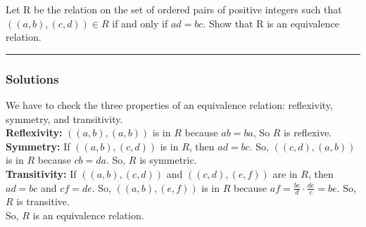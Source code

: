 \newpage
\begin{question}
Let R be the relation on the set of ordered pairs of positive integers such that $((a, b), (c, d)) \in R$ if and only if
$ad = bc$. Show that R is an equivalence relation.
\end{question}

\par\noindent\rule{\textwidth}{0.5pt}

\subsubsection*{Solutions}
We have to check the three properties of an equivalence relation: reflexivity, symmetry, and transitivity.\\
\textbf{Reflexivity: } $((a, b), (a, b))$ is in $R$ because $ab = ba$, So $R$ is reflexive.\\
\textbf{Symmetry: } If $((a, b), (c, d))$ is in $R$, then $ad = bc$. So, $((c, d), (a, b))$ is in $R$ because $cb = da$. So, $R$ is symmetric.\\
\textbf{Transitivity: } If $((a, b), (c, d))$ and $((c, d), (e, f))$ are in $R$, then $ad = bc$ and $cf = de$. So, $((a, b), (e, f))$ is in $R$ because $\displaystyle af = \frac {bc} d \cdot \frac {de} c = be$. So, $R$ is transitive.\\

\noindent
So, $R$ is an equivalence relation.